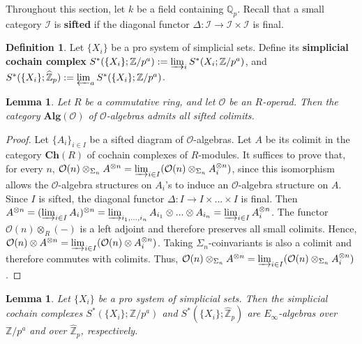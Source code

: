 \documentclass[11pt]{amsart}
\newtheorem{lemma}[theorem]{Lemma}
\theoremstyle{definition}
\newtheorem{definition}[theorem]{Definition}
\numberwithin{equation}{section}
\numberwithin{equation}{section}
\newcommand\QQ{\mathbb{Q}}
\newcommand\ZZ{\mathbb{Z}}
\newcommand\OO{\mathcal{O}}
\begin{document}
Throughout this section, let $k$ be a field containing $\QQ_p$. Recall that a small category $\mathcal{I}$ is \textbf{sifted} if the diagonal functor $\Delta:\mathcal{I}\rightarrow \mathcal{I}\times \mathcal{I}$ is final.

\begin{definition}
Let $\{X_i\}$ be a pro system of simplicial sets. Define its \textbf{simplicial cochain complex} $S^*(\{X_i\};\ZZ/p^a):=\varinjlim_i S^*(X_i;\ZZ/p^a)$, and $S^*(\{X_i\};\widehat{\ZZ}_p):=\varprojlim_{a} S^*(\{X_i\};\ZZ/p^a)$.
\end{definition}

\begin{lemma}\label{Lem: O-algebras have sifted colimits}
Let $R$ be a commutative ring, and let $\mathcal{O}$ be an $R$-operad.  Then the category $\mathbf{Alg}(\mathcal{O})$ of $\mathcal{O}$-algebras admits all sifted colimits.
\end{lemma}

\begin{proof}
Let $\{A_i\}_{i\in I}$ be a sifted diagram of $\mathcal{O}$-algebras. Let $A$ be its colimit in the category $\mathbf{Ch}(R)$ of cochain complexes of $R$-modules. It suffices to prove that, for every $n$, $\mathcal{O}(n)\otimes_{\Sigma_n} A^{\otimes n}=\varinjlim_{i\in I}(\mathcal{O}(n)\otimes_{\Sigma_n} A^{\otimes n}_i)$, since this isomorphism allows the $\OO$-algebra structures on $A_i$'s to induce an $\OO$-algebra structure on $A$. Since $I$ is sifted, the diagonal functor $\Delta:I\rightarrow I\times ...\times I$ is final. Then $A^{\otimes n}=(\varinjlim_{i\in I}A_i)^{\otimes n}=\varinjlim_{i_1,...,i_n} A_{i_1}\otimes ... \otimes A_{i_n}= \varinjlim_{i\in I} A_i^{\otimes n}$. The functor $\mathcal{O}(n)\otimes_{R} (-)$ is a left adjoint and therefore preserves all small colimits. Hence, $\mathcal{O}(n)\otimes A^{\otimes n}=\varinjlim_{i\in I}(\mathcal{O}(n)\otimes A_i^{\otimes n})$. Taking $\Sigma_n$-coinvariants is also a colimit and therefore commutes with colimits. Thus,  $\mathcal{O}(n)\otimes_{\Sigma_n} A^{\otimes n}=\varinjlim_{i\in I}(\mathcal{O}(n)\otimes_{\Sigma_n} A_i^{\otimes n})$.
\end{proof}

\begin{lemma}
Let $\{X_i\}$ be a pro system of simplicial sets. Then the simplicial cochain complexes $S^*(\{X_i\};\ZZ/p^a)$ and $S^*(\{X_i\};\widehat{\ZZ}_p)$ are $E_{\infty}$-algebras over $\ZZ/p^a$ and over $\widehat{\ZZ}_p$, respectively.
\end{lemma}
\end{document}
